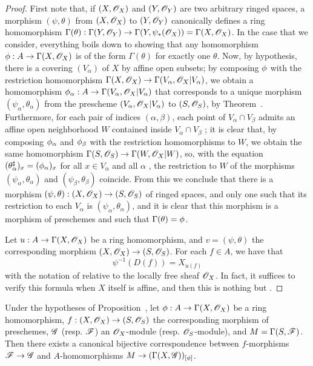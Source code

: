 \begin{proof}
First note that, if $(X,\mathscr{O}_X)$ and $(Y,\mathscr{O}_Y)$ are two arbitrary ringed spaces,
a morphism $(\psi,\theta)$ from $(X,\mathscr{O}_X)$ to $(Y,\mathscr{O}_Y)$ canonically defines a ring homomorphism $\Gamma(\theta):\Gamma(Y,\sh{O}_Y)\to\Gamma(Y,\psi_*(\sh{O}_X))=\Gamma(X,\sh{O}_X)$.
In the case that we consider, everything boils down to showing that any homomorphism $\vphi:A\to\Gamma(X,\sh{O}_X)$ is of the form $\Gamma(\theta)$ for exactly one $\theta$.
Now, by hypothesis, there is a covering $(V_\alpha)$ of $X$ by affine open subsets;
by composing $\phi$ with the restriction homomorphism $\Gamma(X,\sh{O}_X)\to\Gamma(V_\alpha,\sh{O}_X|V_\alpha)$, we obtain a homomorphism $\vphi_\alpha:A\to\Gamma(V_\alpha,\sh{O}_X|V_\alpha)$ that corresponds to a unique morphism $(\psi_\alpha,\theta_\alpha)$ from the prescheme $(V_\alpha,\mathscr{O}_X|V_\alpha)$ to $(S,\mathscr{O}_S)$, by Theorem~.
Furthermore, for each pair of indices $(\alpha,\beta)$, each point of $V_\alpha\cap V_\beta$ admits an affine open neighborhood $W$ contained inside $V_\alpha\cap V_\beta$ ;
it is clear that, by composing $\phi_\alpha$ and $\phi_\beta$ with the restriction homomorphisms to $W$, we obtain the same homomorphism $\Gamma(S,\sh{O}_S)\to\Gamma(W,\sh{O}_X|W)$, so, with the equation $(\theta_\alpha^\sharp)_x=(\phi_\alpha)_x$ for all $x\in V_\alpha$ and all $\alpha$ , the restriction to $W$ of the morphisms $(\psi_\alpha,\theta_\alpha)$ and $(\psi_\beta,\theta_\beta)$ coincide.
From this we conclude that there is a morphism $(\psi,\theta):(X,\sh{O}_X)\to(S,\sh{O}_S)$ of ringed spaces, and only one such that its restriction to each $V_\alpha$ is $(\psi_\alpha,\theta_\alpha)$, and it is clear that this morphism is a morphism of preschemes and such that $\Gamma(\theta)=\phi$.

Let $u:A\to\Gamma(X,\sh{O}_X)$ be a ring homomorphism, and $v=(\psi,\theta)$ the corresponding morphism $(X,\sh{O}_X)\to(S,\sh{O}_S)$.
For each $f\in A$, we have that
\[
  \label{I.2.2.4.1}
  \psi^{-1}(D(f))=X_{u(f)}
  \tag{2.2.4.1}
\]
with the notation of  relative to the locally free sheaf $\mathscr{O}_X$.
In fact, it suffices to verify this formula when $X$ itself is affine, and then this is nothing but .
\end{proof}

\begin{proposition}[2.2.5]
\label{I.2.2.5}
Under the hypotheses of Proposition~, let $\vphi:A\to\Gamma(X,\sh{O}_X)$ be a ring homomorphism, $f:(X,\sh{O}_X)\to(S,\sh{O}_S)$ the corresponding morphism of preschemes, $\mathscr{G}$ (resp. $\mathscr{F}$) an $\mathscr{O}_X$-module (resp. $\mathscr{O}_S$-module), and $M=\Gamma(S,\mathscr{F})$.
Then there exists a canonical bijective
correspondence between $f$-morphisms $\sh{F}\to\sh{G}$  and $A$-homomorphisms $M\to(\Gamma(X,\sh{G}))_{[\vphi]}$.
\end{proposition}

